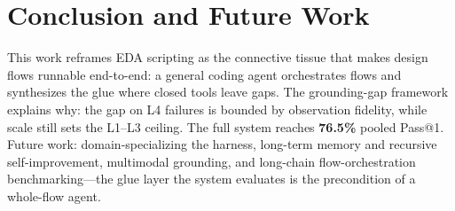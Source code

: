 \section{Conclusion and Future Work}
\label{sec:conclusion}

This work reframes EDA scripting as the connective tissue that makes design flows runnable end-to-end: a general coding agent orchestrates flows and synthesizes the glue where closed tools leave gaps. The grounding-gap framework explains why: the gap on L4 failures is bounded by observation fidelity, while scale still sets the L1--L3 ceiling. The full system reaches \textbf{76.5\%} pooled Pass@1. Future work: domain-specializing the harness, long-term memory and recursive self-improvement, multimodal grounding, and long-chain flow-orchestration benchmarking---the glue layer the system evaluates is the precondition of a whole-flow agent.
